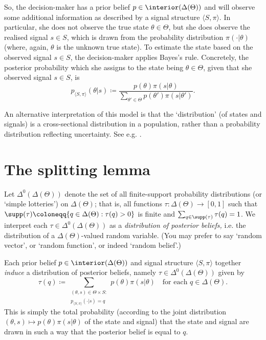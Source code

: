 So, the decision-maker has a prior belief $p \in \interior(\Delta(\Theta))$ and will observe some additional information as described by a signal structure $\langle S, \pi \rangle $. In particular, she does not observe the true state $\theta \in \Theta$, but she does observe the realised signal $s \in S$, which is drawn from the probability distribution $\pi(\cdot|\theta)$ (where, again, $\theta$ is the unknown true state). To estimate the state based on the observed signal $s \in S$, the decision-maker applies Bayes's rule. Concretely, the posterior probability which she assigns to the state being $\theta \in \Theta$, given that she observed signal $s \in S$, is
%
\begin{equation*}
	p_{\langle S, \pi \rangle }(\theta|s)
	\coloneqq \frac{p(\theta) \pi(s|\theta)}{\sum_{\theta' \in \Theta} p(\theta') \pi(s|\theta')} .
\end{equation*}

\begin{remark}
	\label{remark:pop}
	An alternative interpretation of this model is that the `distribution' (of states and signals) is a cross-sectional distribution in a population, rather than a probability distribution reflecting uncertainty. See e.g. \textcite{disc}.
\end{remark}



\section{The splitting lemma}
\label{info:split}

Let $\Delta^0(\Delta(\Theta))$ denote the set of all finite-support probability distributions (or `simple lotteries') on $\Delta(\Theta)$; that is, all functions $\tau : \Delta(\Theta) \to [0,1]$ such that $\supp(\tau) \coloneqq \{ q \in \Delta(\Theta) : \tau(q) > 0 \}$ is finite and $\sum_{q \in \supp(\tau)} \tau(q) = 1$. We interpret each $\tau \in \Delta^0(\Delta(\Theta))$ as a \emph{distribution of posterior beliefs,} i.e. the distribution of a $\Delta(\Theta)$-valued random variable. (You may prefer to say `random vector', or `random function', or indeed `random belief'.)

Each prior belief $p \in \interior(\Delta(\Theta))$ and signal structure $\langle S, \pi \rangle $ together \emph{induce} a distribution of posterior beliefs, namely $\tau \in \Delta^0(\Delta(\Theta))$ given by
%
\begin{equation*}
	\tau(q)
	\coloneqq \sum_{\substack{(\theta,s) \in \Theta \times S :\\ p_{\langle S, \pi \rangle }(\cdot|s) = q}} p(\theta) \pi(s|\theta)
	\quad \text{for each $q \in \Delta(\Theta)$.}
\end{equation*}
%
This is simply the total probability (according to the joint distribution $(\theta,s) \mapsto p(\theta) \pi(s|\theta)$ of the state and signal) that the state and signal are drawn in such a way that the posterior belief is equal to $q$.

